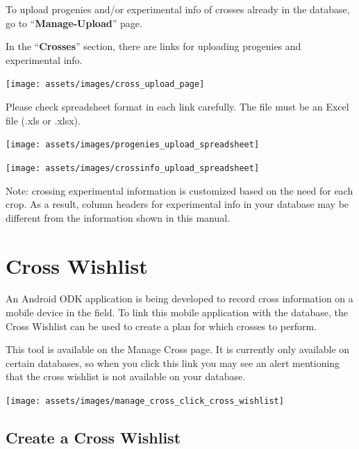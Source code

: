 \documentclass[
  12pt,
]{book}
\begin{document}
To upload progenies and/or experimental info of crosses already in the database, go to ``\textbf{Manage-Upload}'' page.

In the ``\textbf{Crosses}'' section, there are links for uploading progenies and experimental info.

\begin{center}\texttt{[image: assets/images/cross\_upload\_page]} \end{center}

Please check spreadsheet format in each link carefully. The file must be an Excel file (.xls or .xlsx).

\begin{center}\texttt{[image: assets/images/progenies\_upload\_spreadsheet]} \end{center}

\begin{center}\texttt{[image: assets/images/crossinfo\_upload\_spreadsheet]} \end{center}

Note: crossing experimental information is customized based on the need for each crop. As a result, column headers for experimental info in your database may be different from the information shown in this manual.

\hypertarget{cross-wishlist}{%
\section{Cross Wishlist}\label{cross-wishlist}}

An Android ODK application is being developed to record cross information on a mobile device in the field. To link this mobile application with the database, the Cross Wishlist can be used to create a plan for which crosses to perform.

This tool is available on the Manage Cross page. It is currently only available on certain databases, so when you click this link you may see an alert mentioning that the cross wishlist is not available on your database.

\begin{center}\texttt{[image: assets/images/manage\_cross\_click\_cross\_wishlist]} \end{center}

\hypertarget{create-a-cross-wishlist}{%
\subsection{Create a Cross Wishlist}\label{create-a-cross-wishlist}}
\end{document}

